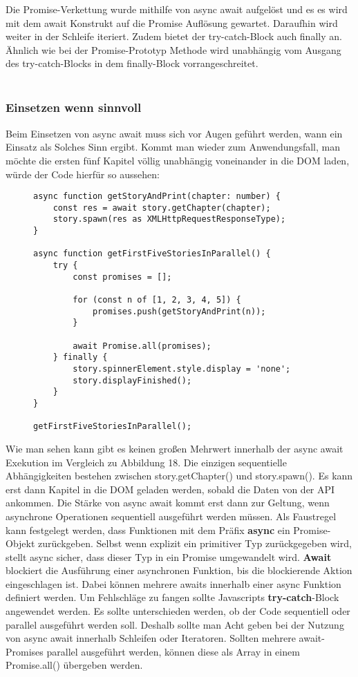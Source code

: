 \noindent
Die Promise-Verkettung wurde mithilfe von async await aufgelöst und es es wird mit dem await Konstrukt auf die Promise Auflösung gewartet. Daraufhin wird weiter in der Schleife iteriert. Zudem bietet der try-catch-Block auch finally an. Ähnlich wie bei der Promise-Prototyp Methode wird unabhängig vom Ausgang des try-catch-Blocks in dem finally-Block vorrangeschreitet.\\\\

\subsubsection{Einsetzen wenn sinnvoll}

Beim Einsetzen von async await muss sich vor Augen geführt werden, wann ein Einsatz als Solches Sinn ergibt. Kommt man wieder zum Anwendungsfall, man möchte die ersten fünf Kapitel völlig unabhängig voneinander in die DOM laden, würde der Code hierfür so aussehen:

\begin{figure}[H]
\begin{lstlisting}
async function getStoryAndPrint(chapter: number) {
    const res = await story.getChapter(chapter);
    story.spawn(res as XMLHttpRequestResponseType);
}

async function getFirstFiveStoriesInParallel() {
    try {
        const promises = [];

        for (const n of [1, 2, 3, 4, 5]) {
            promises.push(getStoryAndPrint(n));
        }

        await Promise.all(promises);
    } finally {
        story.spinnerElement.style.display = 'none';
        story.displayFinished();
    }
}

getFirstFiveStoriesInParallel();
\end{lstlisting}
\end{figure}

\noindent
Wie man sehen kann gibt es keinen großen Mehrwert innerhalb der async await Exekution im Vergleich zu Abbildung 18. Die einzigen sequentielle Abhängigkeiten bestehen zwischen story.getChapter() und story.spawn(). Es kann erst dann Kapitel in die DOM geladen werden, sobald die Daten von der API ankommen. Die Stärke von async await kommt erst dann zur Geltung, wenn asynchrone Operationen sequentiell ausgeführt werden müssen. Als Faustregel kann festgelegt werden, dass Funktionen mit dem Präfix \textbf{async} ein Promise-Objekt zurückgeben. Selbst wenn explizit ein primitiver Typ zurückgegeben wird, stellt async sicher, dass dieser Typ in ein Promise umgewandelt wird. \textbf{Await} blockiert die Ausführung einer asynchronen Funktion, bis die blockierende Aktion eingeschlagen ist. Dabei können mehrere awaits innerhalb einer async Funktion definiert werden. Um Fehlschläge zu fangen sollte Javascripts \textbf{try-catch}-Block angewendet werden. Es sollte unterschieden werden, ob der Code sequentiell oder parallel ausgeführt werden soll. Deshalb sollte man Acht geben bei der Nutzung von async await innerhalb Schleifen oder Iteratoren. Sollten mehrere await-Promises parallel ausgeführt werden, können diese als Array in einem Promise.all() übergeben werden.


